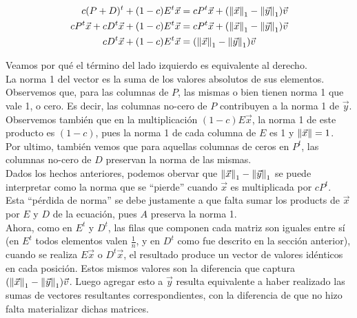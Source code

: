 \begin{align*}
c(P + D)^{t} + (1-c)E^{t} \vec{x} &= cP^{t}\vec{x} + (\left\|\vec{x}\right\|_1 - \left\|\vec{y}\right\|_1)\vec{v} \\
cP^{t}\vec{x} + cD^{t}\vec{x} + (1-c)E^{t}\vec{x} &= cP^{t}\vec{x} + (\left\|\vec{x}\right\|_1 - \left\|\vec{y}\right\|_1)\vec{v} \\
cD^{t}\vec{x} + (1-c)E^{t}\vec{x} &= (\left\|\vec{x}\right\|_1 - \left\|\vec{y}\right\|_1)\vec{v}
\end{align*}

Veamos por qué el término del lado izquierdo es equivalente al derecho.\\

La norma 1 del vector es la suma de los valores absolutos de sus elementos.
Observemos que, para las columnas de $P$, las mismas o bien tienen norma 1 que vale 1, o cero.
Es decir, las columnas no-cero de $P$ contribuyen a la norma 1 de $\vec{y}$.\\

Observemos también que en la multiplicación $(1-c)E\vec{x}$, la norma 1 de este producto es
$(1-c)$, pues la norma 1 de cada columna de $E$ es 1 y $\left\|\vec{x}\right\| = 1$.\\

Por ultimo, también vemos que para aquellas columnas de ceros en $P^{t}$, las columnas no-cero de
 $D$ preservan la norma de las mismas.\\

Dados los hechos anteriores, podemos obervar que $\left\|\vec{x}\right\|_1 - \left\|\vec{y}\right\|_1$ se
puede interpretar como la norma que se ``pierde'' cuando $\vec{x}$  es multiplicada por $cP^t$.
Esta ``pérdida de norma'' se debe justamente a que falta sumar los products de $\vec{x}$  por
$E$  y $D$ de la ecuación, pues $A$ preserva la norma 1.\\

Ahora, como en $E^t$ y $D^t$, las filas que componen cada matriz son iguales entre sí (en $E^t$ todos elementos valen $\frac{1}{n}$, y
en $D^t$ como fue descrito en la sección anterior), cuando se realiza $E\vec{x}$ o $D^t\vec{x}$, el resultado
produce un vector de valores idénticos en cada posición. Estos mismos valores son la diferencia que captura
$(\left\|\vec{x}\right\|_1 - \left\|\vec{y}\right\|_1) \vec{v}$. Luego agregar esto a $\vec{y}$ resulta
equivalente a haber realizado las sumas de vectores resultantes correspondientes, con la diferencia
de que no hizo falta materializar dichas matrices.\\

